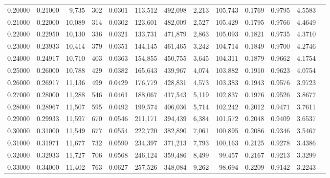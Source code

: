 \begin{tabular}{rrrrrrrrrrrrr}
0.20000 & 0.21000 &  9,735 &   302 &                                     0.0301 & 113,512 & 492,098 &   2,213 & 105,743 & 0.1769 & 0.9795 & 4.5583 \\
0.21000 & 0.22000 & 10,089 &   314 &                                     0.0302 & 123,601 & 482,009 &   2,527 & 105,429 & 0.1795 & 0.9766 & 4.4649 \\
0.22000 & 0.22950 & 10,130 &   336 &                                     0.0321 & 133,731 & 471,879 &   2,863 & 105,093 & 0.1821 & 0.9735 & 4.3710 \\
0.23000 & 0.23933 & 10,414 &   379 &                                     0.0351 & 144,145 & 461,465 &   3,242 & 104,714 & 0.1849 & 0.9700 & 4.2746 \\
0.24000 & 0.24917 & 10,710 &   403 &                                     0.0363 & 154,855 & 450,755 &   3,645 & 104,311 & 0.1879 & 0.9662 & 4.1754 \\
0.25000 & 0.26000 & 10,788 &   429 &                                     0.0382 & 165,643 & 439,967 &   4,074 & 103,882 & 0.1910 & 0.9623 & 4.0754 \\
0.26000 & 0.26917 & 11,136 &   499 &                                     0.0429 & 176,779 & 428,831 &   4,573 & 103,383 & 0.1943 & 0.9576 & 3.9723 \\
0.27000 & 0.28000 & 11,288 &   546 &                                     0.0461 & 188,067 & 417,543 &   5,119 & 102,837 & 0.1976 & 0.9526 & 3.8677 \\
0.28000 & 0.28967 & 11,507 &   595 &                                     0.0492 & 199,574 & 406,036 &   5,714 & 102,242 & 0.2012 & 0.9471 & 3.7611 \\
0.29000 & 0.29933 & 11,597 &   670 &                                     0.0546 & 211,171 & 394,439 &   6,384 & 101,572 & 0.2048 & 0.9409 & 3.6537 \\
0.30000 & 0.31000 & 11,549 &   677 &                                     0.0554 & 222,720 & 382,890 &   7,061 & 100,895 & 0.2086 & 0.9346 & 3.5467 \\
0.31000 & 0.31971 & 11,677 &   732 &                                     0.0590 & 234,397 & 371,213 &   7,793 & 100,163 & 0.2125 & 0.9278 & 3.4386 \\
0.32000 & 0.32933 & 11,727 &   706 &                                     0.0568 & 246,124 & 359,486 &   8,499 &  99,457 & 0.2167 & 0.9213 & 3.3299 \\
0.33000 & 0.34000 & 11,402 &   763 &                                     0.0627 & 257,526 & 348,084 &   9,262 &  98,694 & 0.2209 & 0.9142 & 3.2243 \\

\end{tabular}
